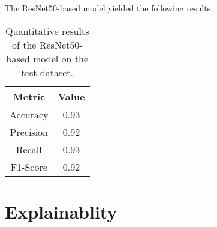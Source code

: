 \documentclass[../main]{subfiles}
\begin{document}
The ResNet50-based model yielded the following results.

\begin{table}[h]
    \centering
    \begin{tabular}{|c|c|}
        \hline
        \textbf{Metric} & \textbf{Value} \\
        \hline
        Accuracy & 0.93 \\
        Precision & 0.92 \\
        Recall & 0.93 \\
        F1-Score & 0.92 \\
        \hline
    \end{tabular}
    \caption{Quantitative results of the ResNet50-based model on the test dataset.}
    \label{tab:quantitative-results}
\end{table}

\section{Explainablity}
\label{sec:explainability}
\end{document}
